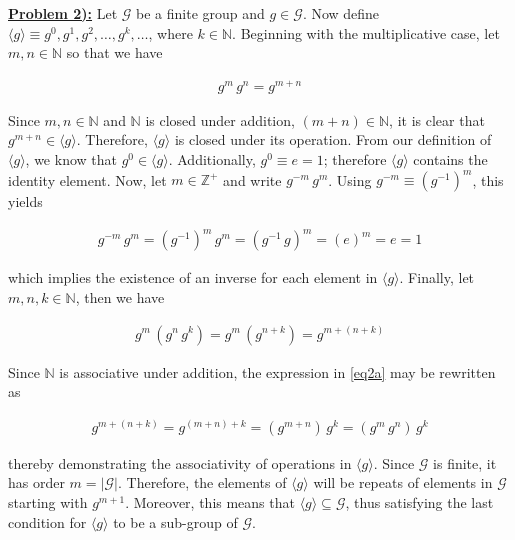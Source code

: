 \documentclass{article}[12]
\numberwithin{equation}{section}
\newcommand{\numbpr}[1]{\setcounter{section}{#1} \setcounter{equation}{0}}
\newcommand{\prob}[1]{\textbf{\underline{Problem #1):}}}
\newcommand{\N}{\mathbb{N}}
\newcommand{\Z}{\mathbb{Z}}
\begin{document}
\begin{flushleft}
\vspace{0.35 in}



\numbpr{2}
\prob{2} Let $\mathcal{G}$ be a finite group and $g \in \mathcal{G}$.  Now define $\langle g \rangle \equiv g^0, g^1, g^2, \dots, g^k, \dots$, where $k \in \N$.  Beginning with the multiplicative case, let $m, n \in \N$ so that we have

\begin{align*}
  g^m \, g^n = g^{m + n}
\end{align*}

Since $m, n \in \N$ and $\N$ is closed under addition, $\left( m + n \right) \in \N$, it is clear that $g^{m + n} \in \langle g \rangle$.  Therefore, $\langle g \rangle$ is closed under its operation.  From our definition of $\langle g \rangle$, we know that $g^0 \in \langle g \rangle$.  Additionally, $g^0 \equiv e = 1$; therefore $\langle g \rangle$ contains the identity element.  Now, let $m \in \Z^+$ and write $g^{-m} \, g^m$.  Using $g^{-m} \equiv \left( g^{-1} \right)^m$, this yields

\begin{align*}
  g^{-m} \, g^m = \left( g^{-1} \right)^m \, g^m = \left( g^{-1} \, g \right)^m = \left( e \right)^m = e = 1
\end{align*}

which implies the existence of an inverse for each element in $\langle g \rangle$.  Finally, let $m, n, k \in \N$, then we have

\begin{align}
  g^m \, \left( g^n \, g^k \right) = g^m \, \left( g^{n + k} \right) = g^{m + \left( n + k \right)} \label{eq2a}
\end{align}

Since $\N$ is associative under addition, the expression in \ref{eq2a} may be rewritten as

\begin{align*}
  g^{m + \left( n + k \right)} = g^{\left( m + n \right) + k} = \left( g^{m + n} \right) \, g^k = \left( g^m \, g^n \right) \, g^k
\end{align*}

thereby demonstrating the associativity of operations in $\langle g \rangle$.  Since $\mathcal{G}$ is finite, it has order $m = \lvert \mathcal{G} \rvert$.  Therefore, the elements of $\langle g \rangle$ will be repeats of elements in $\mathcal{G}$ starting with $g^{m + 1}$.  Moreover, this means that $\langle g \rangle \subseteq \mathcal{G}$, thus satisfying the last condition for $\langle g \rangle$ to be a sub-group of $\mathcal{G}$. \newline


\end{flushleft}
\end{document}
